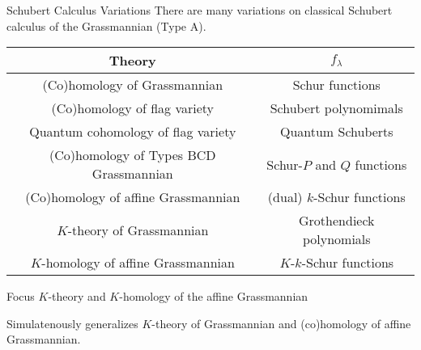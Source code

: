 \documentclass{beamer}
\theoremstyle{definition}
\begin{document}
\begin{frame}[fragile]{Schubert Calculus Variations}
    There are many variations on classical Schubert calculus of
    the Grassmannian (Type A).
    \pause
    \begin{tabular}{|c|c|}
      \hline
      Theory
      & \(f_\lambda\) \\
      \hline
      (Co)homology of Grassmannian
      & Schur functions\\
      \hline
      (Co)homology of flag variety
      & Schubert polynomimals\\
      \hline
      Quantum cohomology of flag variety
      & Quantum Schuberts\\
      \hline
      (Co)homology of Types BCD Grassmannian
      & Schur-\(P\) and \(Q\) functions\\
      \hline
      (Co)homology of affine Grassmannian
      & (dual) \(k\)-Schur functions\\
      \hline
      \(K\)-theory of Grassmannian
      & Grothendieck polynomials\\
      \hline
      \(K\)-homology of affine Grassmannian
      & \(K\)-\(k\)-Schur functions \\
      \hline
    \end{tabular}
    \pause
  \begin{block}{Focus}
    \(K\)-theory and \(K\)-homology of the affine Grassmannian \pause
  \end{block}
  Simulatenously generalizes \(K\)-theory of Grassmannian and
    (co)homology of affine Grassmannian.

\end{frame}
\end{document}
